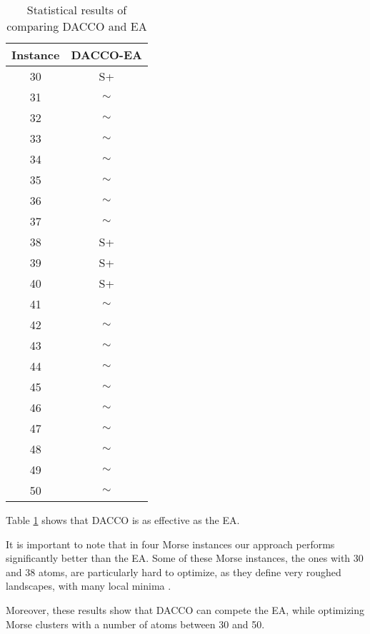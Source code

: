 			\pagebreak
			\begin{table}[!htdp]
					\begin{center}
						\begin{tabular}{| c | c |}
							\hline
							\textbf{Instance} & \textbf{DACCO-EA} \\ \hline
							30 & S+ \\ \hline
							31 & $\sim$ \\ \hline
							32 & $\sim$ \\ \hline
							33 & $\sim$ \\ \hline
							34 & $\sim$ \\ \hline
							35 & $\sim$ \\ \hline
							36 & $\sim$ \\ \hline
							37 & $\sim$ \\ \hline
							38 & S+ \\ \hline
							39 & S+ \\ \hline
							40 & S+ \\\hline
							41 & $\sim$ \\ \hline
							42 & $\sim$ \\ \hline
							43 & $\sim$ \\ \hline
							44 & $\sim$ \\ \hline
							45 & $\sim$ \\ \hline
							46 & $\sim$ \\ \hline
							47 & $\sim$ \\ \hline
							48 & $\sim$ \\ \hline 
							49 & $\sim$ \\ \hline
							50 & $\sim$ \\ \hline
						\end{tabular}
						\caption{Statistical results of comparing DACCO and EA}
						\label{tab:statistical_comparison_ea}
					\end{center}
			\end{table}
		Table \ref{tab:statistical_comparison_ea} shows that DACCO is as effective as the EA.
		
		It is important to note that in four Morse instances our approach performs significantly better than the EA. Some of these Morse instances,  the ones with 30 and 38 atoms, are particularly hard to optimize, as they define very roughed landscapes, with many local minima \cite{doye97}.
		
		Moreover, these results show that DACCO can compete the EA, while optimizing Morse clusters with a number of atoms between 30 and 50.
		\pagebreak
